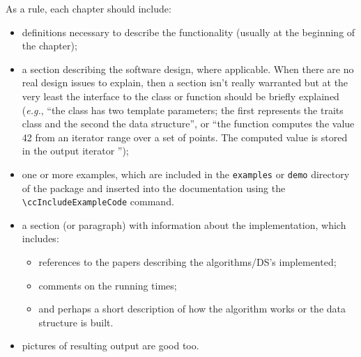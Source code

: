 As a rule, each chapter should include:
\begin{itemize}
 \item definitions necessary to describe the functionality (usually at the
       beginning of the chapter);

 \item a section describing the software design, where applicable.  When there
       are no real design issues to explain, then a section isn't really
       warranted but at the very least the interface to the class or function
       should be briefly explained (\textit{e.g.}, ``the class
        has two template parameters; the first
       represents the traits class and the second the data structure'', or
       ``the function  computes the value 42
        from an iterator range \ccc{[b, e)} over a set of points.  The
        computed value is stored in the output iterator '');

  \item one or more examples, which are included in the \texttt{examples}
        or \texttt{demo} directory of the package and inserted into the
        documentation using the \verb|\ccIncludeExampleCode| command.

  \item a section (or paragraph) with information about the
        implementation, which includes:
        \begin{itemize}
          \item references to the papers describing the algorithms/DS's
                implemented;
          \item comments on the running times;
          \item and perhaps a short description of how the algorithm works or
                the data structure is built.
        \end{itemize}

  \item pictures of resulting output are good too.
\end{itemize}

